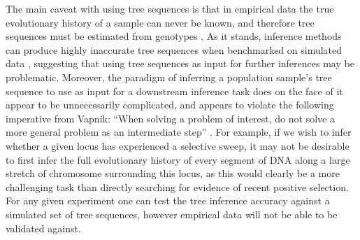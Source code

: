 The main caveat with using tree sequences is that in empirical data the true evolutionary history of a sample can never be known, and therefore tree sequences must be estimated from genotypes \cite{kelleherInferringWholegenomeHistories2019,mahmoudiBayesianInferenceAncestral2022}. As it stands, inference methods can produce highly inaccurate tree sequences when benchmarked on simulated data \cite{zhangBiobankscaleInferenceAncestral2023a}, suggesting that using tree sequences as input for further inferences may be problematic. Moreover, the paradigm of inferring a population sample's tree sequence to use as input for a downstream inference task does on the face of it appear to be unnecessarily complicated, and appears to violate the following imperative from Vapnik: “When solving a problem of interest, do not solve a more general problem as an intermediate step” \cite{vapnikEstimationDependencesBased2006}. For example, if we wish to infer whether a given locus has experienced a selective sweep, it may not be desirable to first infer the full evolutionary history of every segment of DNA along a large stretch of chromosome surrounding this locus, as this would clearly be a more challenging task than directly searching for evidence of recent positive selection. For any given experiment one can test the tree inference accuracy against a simulated set of tree sequences, however empirical data will not be able to be validated against.

